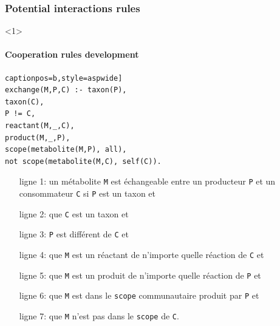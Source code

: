 \documentclass[8pt]{beamer}
\begin{document}
\begin{frame}[fragile]
\frametitle{Potential interactions rules}
\begin{onlyenv}<1>
\framesubtitle{Cooperation rules development}
\begin{minipage}{0.5\textwidth}
\begin{lstlisting}[mathescape=True, label={lst:echange}] captionpos=b,style=aspwide]
exchange(M,P,C) :- taxon(P),
taxon(C),
P != C,
reactant(M,_,C),
product(M,_,P),
scope(metabolite(M,P), all),
not scope(metabolite(M,C), self(C)).
\end{lstlisting}
\begin{itemize}
	\item[ligne 1:] un métabolite \texttt{M} est échangeable entre un producteur \texttt{P} et un consommateur \texttt{C} si \texttt{P} est un taxon et 
	\item[ligne 2:] que \texttt{C} est un taxon et
	\item[ligne 3:] \texttt{P} est différent de \texttt{C} et
	\item[ligne 4:] que \texttt{M} est un réactant de n'importe quelle réaction de \texttt{C} et 
	\item[ligne 5:] que \texttt{M} est un produit de n'importe quelle réaction de \texttt{P} et
	\item[ligne 6:] que \texttt{M} est dans le \texttt{scope} communautaire produit par \texttt{P} et 
	\item[ligne 7:] que \texttt{M} n'est pas dans le \texttt{scope} de \texttt{C}.
\end{itemize}
\end{minipage}%
\hspace{0.25cm}
\hfill
\begin{minipage}{0.45\textwidth}

\end{minipage}
\end{onlyenv}
\end{frame}
\end{document}

